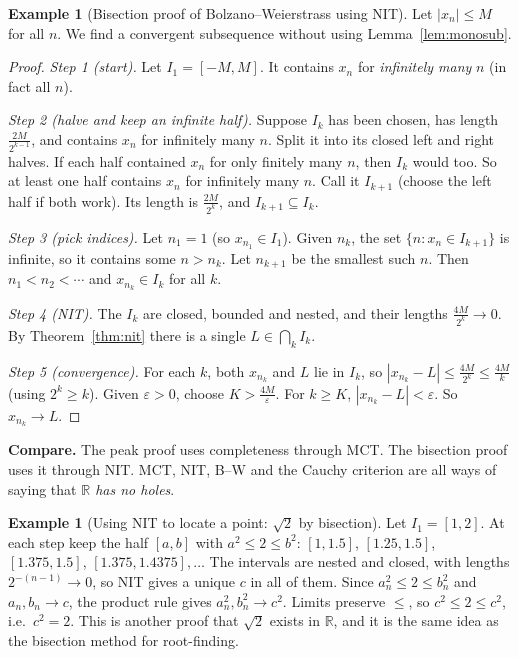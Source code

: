 \documentclass[11pt]{article}
\theoremstyle{definition}
\newtheorem{ex}[defn]{Example}
\newcommand{\R}{\mathbb{R}}
\newcommand{\eps}{\varepsilon}
\newcommand{\key}[1]{\textcolor{red!70!black}{\textbf{#1}}}
\begin{document}
\begin{ex}[Bisection proof of Bolzano--Weierstrass using NIT]\label{ex:bwbisect}
Let $|x_n|\le M$ for all $n$. We find a convergent subsequence without
using Lemma~\ref{lem:monosub}.

\begin{proof}
\emph{Step 1 (start).} Let $I_1=[-M,M]$. It contains $x_n$ for
\emph{infinitely many} $n$ (in fact all $n$).

\emph{Step 2 (halve and keep an infinite half).} Suppose $I_k$ has been
chosen, has length $\frac{2M}{2^{k-1}}$, and contains $x_n$ for infinitely
many $n$. Split it into its closed left and right halves. If each half
contained $x_n$ for only finitely many $n$, then $I_k$ would too. So at
least one half contains $x_n$ for infinitely many $n$. Call it $I_{k+1}$
(choose the left half if both work). Its length is $\frac{2M}{2^k}$, and
$I_{k+1}\subseteq I_k$.

\emph{Step 3 (pick indices).} Let $n_1=1$ (so $x_{n_1}\in I_1$). Given
$n_k$, the set $\{n:x_n\in I_{k+1}\}$ is infinite, so it contains some
$n>n_k$. Let $n_{k+1}$ be the smallest such $n$. Then
$n_1<n_2<\cdots$ and $x_{n_k}\in I_k$ for all $k$.

\emph{Step 4 (NIT).} The $I_k$ are closed, bounded and nested, and their
lengths $\frac{4M}{2^k}\to0$. By Theorem~\ref{thm:nit} there is a single
$L\in\bigcap_kI_k$.

\emph{Step 5 (convergence).} For each $k$, both $x_{n_k}$ and $L$ lie in
$I_k$, so $|x_{n_k}-L|\le\frac{4M}{2^k}\le\frac{4M}k$ (using $2^k\ge k$).
Given $\eps>0$, choose $K>\frac{4M}\eps$. For $k\ge K$,
$|x_{n_k}-L|<\eps$. So $x_{n_k}\to L$.
\end{proof}
\noindent\key{Compare.} The peak proof uses completeness through MCT. The
bisection proof uses it through NIT. MCT, NIT, B--W and the Cauchy
criterion are all ways of saying that \emph{$\R$ has no holes}.
\end{ex}

\begin{ex}[Using NIT to locate a point: $\sqrt2$ by bisection]
Let $I_1=[1,2]$. At each step keep the half $[a,b]$ with $a^2\le2\le b^2$:
$[1,1.5]$, $[1.25,1.5]$, $[1.375,1.5]$, $[1.375,1.4375],\dots$ The
intervals are nested and closed, with lengths $2^{-(n-1)}\to0$, so NIT
gives a unique $c$ in all of them. Since $a_n^2\le2\le b_n^2$ and
$a_n,b_n\to c$, the product rule gives $a_n^2,b_n^2\to c^2$. Limits
preserve $\le$, so $c^2\le2\le c^2$, i.e.\ $c^2=2$. This is another
proof that $\sqrt2$ exists in $\R$, and it is the same idea as the
bisection method for root-finding.
\end{ex}
\end{document}
